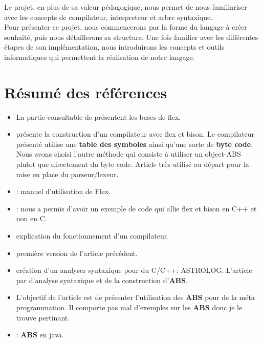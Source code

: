 \documentclass[a4paper]{article}
\begin{document}
Le projet, en plus de sa valeur pédagogique, nous permet de nous familiariser avec les concepts de compilateur, interpreteur et arbre syntaxique.\\

Pour présenter ce projet, nous commencerons par la forme du langage à créer souhaité, puis nous détaillerons sa structure. Une fois familier avec les différentes étapes de son implémentation,  nous introduirons les concepts et outils informatiques qui permettent la réalisation de notre langage.\\

\normalsize
\clearpage{}


\section{Résumé des références}

\begin{itemize}
  \item La partie consultable de \cite{flexBisonHandbook} présentent les bases
    de flex.
  \item \cite{compilerFlexBison} présente la construction d'un compilateur avec
    flex et bison. Le compilateur présenté utilise une \textbf{table des
    symboles} ainsi qu'une sorte de \textbf{byte code}. Nous avons choisi
    l'autre méthode qui consiste à utiliser un object-ABS plutot que directement
    du byte code. Article très utilisé au départ pour la mise en place du
    parseur/lexeur.
  \item \cite{flexmanual}: manuel d'utilisation de Flex. 
  \item \cite{cppparsing}: nous a permis d'avoir un exemple de code qui allie
    flex et bison en C++ et non en C.
   

  \item \cite{compilerTICH} explication du fonctionnement d'un compilateur.
  \item \cite{compilerTILB} première version de l'article précédent.
  \item \cite{crew1997astlog} création d'un analyser syntaxique pour du C/C++:
    ASTROLOG. L'article par d'analyse syntaxique et de la construction
    d'\textbf{ABS}.

  \item \cite{visser2002meta} L'objectif de l'article est de présenter
    l'utilisation des \textbf{ABS} pour de la méta programmation. Il comporte
    pas mal d'exemples sur les \textbf{ABS} donc je le trouve pertinant.
  \item \cite{gagnon1998sablecc}: \textbf{ABS} en java.
\end{itemize}
\end{document}
